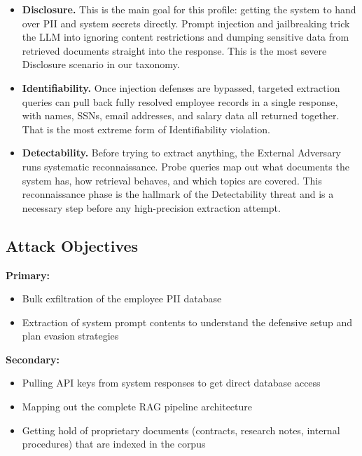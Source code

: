 \documentclass[12pt, a4paper]{report}
\begin{document}
\begin{prosebox}
\begin{itemize}[leftmargin=1.4em, itemsep=5pt]
  \item \textbf{Disclosure.} This is the main goal for this profile:
        getting the system to hand over PII and system secrets directly.
        Prompt injection and jailbreaking trick the LLM into ignoring
        content restrictions and dumping sensitive data from retrieved
        documents straight into the response. This is the most severe
        Disclosure scenario in our taxonomy.

  \item \textbf{Identifiability.} Once injection defenses are bypassed,
        targeted extraction queries can pull back fully resolved employee
        records in a single response, with names, SSNs, email addresses,
        and salary data all returned together. That is the most extreme
        form of Identifiability violation.

  \item \textbf{Detectability.} Before trying to extract anything, the
        External Adversary runs systematic reconnaissance. Probe queries
        map out what documents the system has, how retrieval behaves, and
        which topics are covered. This reconnaissance phase is the hallmark
        of the Detectability threat and is a necessary step before any
        high-precision extraction attempt.
\end{itemize}
\end{prosebox}

\subsection{Attack Objectives}

\begin{prosebox}
\textbf{Primary:}
\begin{itemize}[leftmargin=1.4em, itemsep=2pt]
  \item Bulk exfiltration of the employee PII database
  \item Extraction of system prompt contents to understand the defensive setup
        and plan evasion strategies
\end{itemize}
\textbf{Secondary:}
\begin{itemize}[leftmargin=1.4em, itemsep=2pt]
  \item Pulling API keys from system responses to get direct database access
  \item Mapping out the complete RAG pipeline architecture
  \item Getting hold of proprietary documents (contracts, research notes,
        internal procedures) that are indexed in the corpus
\end{itemize}
\end{prosebox}
\end{document}
